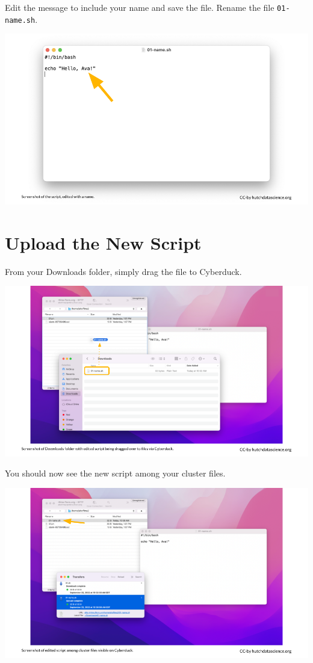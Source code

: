 \documentclass[
]{book}
\begin{document}
Edit the message to include your name and save the file. Rename the file \texttt{01-name.sh}.

\includegraphics[width=1\linewidth]{resources/images/08-upload-download_files/figure-latex//1BQxrVYdKZTbpCaF-i_q9w7s9x034lEXpQZDU-Sl09cs_g1579ffd7b01_12_45}

\hypertarget{upload-the-new-script}{%
\section{Upload the New Script}\label{upload-the-new-script}}

From your Downloads folder, simply drag the file to Cyberduck.

\includegraphics[width=1\linewidth]{resources/images/08-upload-download_files/figure-latex//1BQxrVYdKZTbpCaF-i_q9w7s9x034lEXpQZDU-Sl09cs_g1579ffd7b01_12_49}

You should now see the new script among your cluster files.

\includegraphics[width=1\linewidth]{resources/images/08-upload-download_files/figure-latex//1BQxrVYdKZTbpCaF-i_q9w7s9x034lEXpQZDU-Sl09cs_g15cf3fa00a4_0_6}
\end{document}
